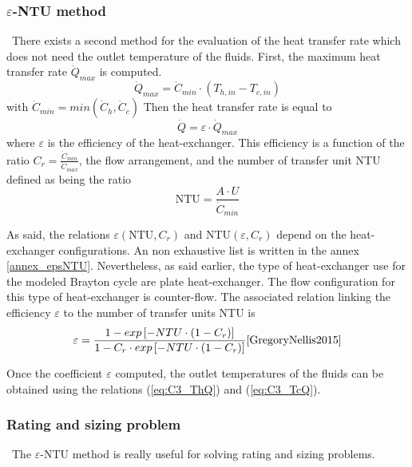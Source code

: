 \subsubsection{$\varepsilon$-NTU method}
\quad\ There exists a second method for the evaluation of the heat transfer rate which does not need the outlet temperature of the fluids. First, the maximum heat transfer rate \(\dot{Q}_{max}\) is computed.
\begin{equation}
    \dot{Q}_{max} = \dot{C}_{min}\cdot (T_{h,in} - T_{c,in})
\end{equation}
with \(\dot{C}_{min}=min(\dot{C}_h,\dot{C}_c)\)
Then the heat transfer rate is equal to
\begin{equation}
    \dot{Q} = \varepsilon\cdot\dot{Q}_{max}
\end{equation}
where \(\varepsilon\) is the efficiency of the heat-exchanger. This efficiency is a function of the ratio \(C_r = \frac{\dot{C}_{min}}{\dot{C}_{max}}\), the flow arrangement, and the number of transfer unit NTU defined as being the ratio
\begin{equation}
    \text{NTU} = \frac{A\cdot U}{\dot{C}_{min}}\label{eq:C3_NTU}
\end{equation}

As said, the relations \(\varepsilon(\text{NTU},C_r)\) and \(\text{NTU}(\varepsilon,C_r)\) depend on the heat-exchanger configurations. An non exhaustive list is written in the annex \ref{annex_epsNTU}\cite{GregoryNellis2015}. Nevertheless, as said earlier, the type of heat-exchanger use for the modeled Brayton cycle are plate heat-exchanger. The flow configuration for this type of heat-exchanger is counter-flow. The associated relation linking the efficiency \(\varepsilon\) to the number of transfer units  NTU is
\begin{equation}
    \varepsilon = \frac{1 - exp\left[-NTU\cdot \left(1 - C_r\right)\right]}{1 - C_r\cdot exp\left[-NTU\cdot \left(1 - C_r\right)\right]}\cite{GregoryNellis2015}
\end{equation}

Once the coefficient \(\varepsilon\) computed, the outlet temperatures of the fluids can be obtained using the relations (\ref{eq:C3_ThQ}) and (\ref{eq:C3_TcQ}).

\subsubsection{Rating and sizing problem}
\quad\ The \(\varepsilon\)-NTU method is really useful for solving rating and sizing problems.

